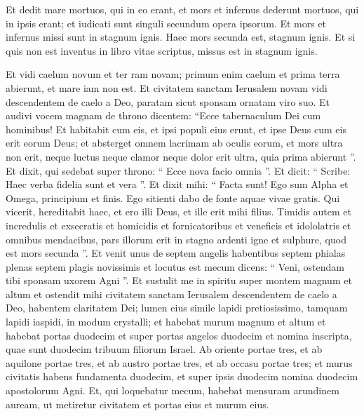 \begin{biblechapter}
\begin{biblechapter}
\begin{biblechapter}
\begin{biblechapter}
\begin{biblechapter}
\begin{biblechapter}
\begin{biblechapter}
\begin{biblechapter}
\begin{biblechapter}
\begin{biblechapter}
\begin{biblechapter}
\begin{biblechapter}
\begin{biblechapter}
\begin{biblechapter}
\begin{biblechapter}
\begin{biblechapter}
\begin{biblechapter}
\begin{biblechapter}
\begin{biblechapter}
\begin{biblechapter}
\verse Et dedit mare mortuos, qui in eo erant, et mors et infernus dederunt mortuos, qui in ipsis erant; et iudicati sunt singuli secundum opera ipsorum. 
\verse Et mors et infernus missi sunt in stagnum ignis. Haec mors secunda est, stagnum ignis. 
\verse Et si quis non est inventus in libro vitae scriptus, missus est in stagnum ignis.
 
\begin{biblechapter}
\verse Et vidi caelum novum et ter ram novam; primum enim caelum et prima terra abierunt, et mare iam non est. 
\verse Et civitatem sanctam Ierusalem novam vidi descendentem de caelo a Deo, paratam sicut sponsam ornatam viro suo. 
\verse Et audivi vocem magnam de throno dicentem: “Ecce tabernaculum Dei cum hominibus! Et habitabit cum eis, et ipsi populi eius erunt, et ipse Deus cum eis erit eorum Deus; 
\verse et absterget omnem lacrimam ab oculis eorum, et mors ultra non erit, neque luctus neque clamor neque dolor erit ultra, quia prima abierunt ”.
 \verse Et dixit, qui sedebat super throno: “ Ecce nova facio omnia ”. Et dicit: “ Scribe: Haec verba fidelia sunt et vera ”. 
\verse Et dixit mihi: “ Facta sunt! Ego sum Alpha et Omega, principium et finis. Ego sitienti dabo de fonte aquae vivae gratis. 
\verse Qui vicerit, hereditabit haec, et ero illi Deus, et ille erit mihi filius. 
\verse Timidis autem et incredulis et exsecratis et homicidis et fornicatoribus et veneficis et idololatris et omnibus mendacibus, pars illorum erit in stagno ardenti igne et sulphure, quod est mors secunda ”.
 \verse Et venit unus de septem angelis habentibus septem phialas plenas septem plagis novissimis et locutus est mecum dicens: “ Veni, ostendam tibi sponsam uxorem Agni ”. 
\verse Et sustulit me in spiritu super montem magnum et altum et ostendit mihi civitatem sanctam Ierusalem descendentem de caelo a Deo, 
\verse habentem claritatem Dei; lumen eius simile lapidi pretiosissimo, tamquam lapidi iaspidi, in modum crystalli; 
\verse et habebat murum magnum et altum et habebat portas duodecim et super portas angelos duodecim et nomina inscripta, quae sunt duodecim tribuum filiorum Israel. 
\verse Ab oriente portae tres, et ab aquilone portae tres, et ab austro portae tres, et ab occasu portae tres; 
\verse et murus civitatis habens fundamenta duodecim, et super ipsis duodecim nomina duodecim apostolorum Agni.
 \verse Et, qui loquebatur mecum, habebat mensuram arundinem auream, ut metiretur civitatem et portas eius et murum eius. 

\end{biblechapter}
\end{biblechapter}
\end{biblechapter}
\end{biblechapter}
\end{biblechapter}
\end{biblechapter}
\end{biblechapter}
\end{biblechapter}
\end{biblechapter}
\end{biblechapter}
\end{biblechapter}
\end{biblechapter}
\end{biblechapter}
\end{biblechapter}
\end{biblechapter}
\end{biblechapter}
\end{biblechapter}
\end{biblechapter}
\end{biblechapter}
\end{biblechapter}
\end{biblechapter}
